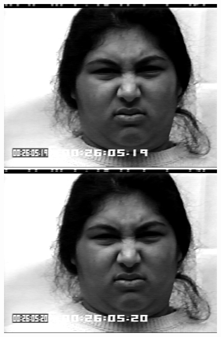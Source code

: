 \documentclass[12pt, a4paper]{scrbook}
\begin{document}
\begin{figure}[h]
\begin{minipage}[b]{.2\linewidth}
		\includegraphics[width=\linewidth]{Bilder/Disgust7.png}
	\end{minipage}
	\hspace{.025\linewidth}%
	\begin{minipage}[b]{.2\linewidth} %
		\includegraphics[width=\linewidth]{Bilder/Disgust8.png}
	\end{minipage} 
	\newline
	\begin{minipage}[b]{.2\linewidth} %

\end{minipage}
\end{figure}
\end{document}
